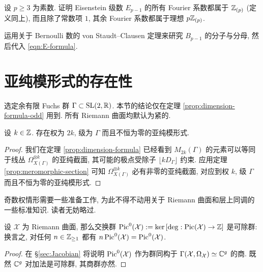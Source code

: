 \begin{exercise}\label{exo:Deligne-congruence}
	设 $p \geq 3$ 为素数. 证明 Eisenstein 级数 $E_{p-1}$ 的所有 Fourier 系数都属于 $\mathbb{Z}_{(p)}$ (定义同上), 而且除了常数项 $1$, 其余 Fourier 系数都属于理想 $p \mathbb{Z}_{(p)}$.

	\begin{hint}
		运用关于 Bernoulli 数的 von Staudt--Clausen 定理来研究 $B_{p-1}$ 的分子与分母, 然后代入 \eqref{eqn:E-formula}.
	\end{hint}
\end{exercise}

\section{亚纯模形式的存在性}
选定余有限 Fuchs 群 $\Gamma \subset \operatorname{SL}(2,\mathbb{R})$. 本节的结论仅在定理 \ref{prop:dimension-formula-odd} 用到. 所有 Riemann 曲面均默认为紧的.

\begin{theorem}
	设 $k \in \mathbb{Z}$. 存在权为 $2k$, 级为 $\Gamma$ 而且不恒为零的亚纯模形式.
\end{theorem}
\begin{proof}
	我们在定理 \ref{prop:dimension-formula} 已经看到 $M_{2k}(\Gamma)$ 的元素可以等同于线丛 $\Omega_{X(\Gamma)}^{\otimes k}$ 的亚纯截面, 其可能的极点受除子 $\lfloor k D_\Gamma\rfloor$ 约束. 应用定理 \ref{prop:meromorphic-section} 可知 $\Omega_{X(\Gamma)}^{\otimes k}$ 必有非零的亚纯截面, 对应到权 $k$, 级 $\Gamma$ 而且不恒为零的亚纯模形式.
\end{proof}

奇数权情形需要一些准备工作, 为此不得不动用关于 Riemann 曲面和层上同调的一些标准知识. 读者无妨略过.
\begin{lemma}\label{prop:Jac-divisible}
	设 $\mathcal{X}$ 为 Riemann 曲面, 那么交换群 $\operatorname{Pic}^0(\mathcal{X}) := \operatorname{ker}\left[ \deg: \operatorname{Pic}(\mathcal{X}) \to \mathbb{Z} \right]$ 是可除群: 换言之, 对任何 $n \in \mathbb{Z}_{\geq 1}$ 都有 $n\operatorname{Pic}^0(\mathcal{X}) = \operatorname{Pic}^0(\mathcal{X})$.
\end{lemma}
\begin{proof}
	在 \S\ref{sec:Jacobian} 将说明 $\operatorname{Pic}^0(\mathcal{X})$ 作为群同构于 $\Gamma(\mathcal{X}, \Omega_{\mathcal{X}}) \simeq \mathbb{C}^g$ 的商. 既然 $\mathbb{C}^g$ 对加法是可除群, 其商群亦然.
\end{proof}

